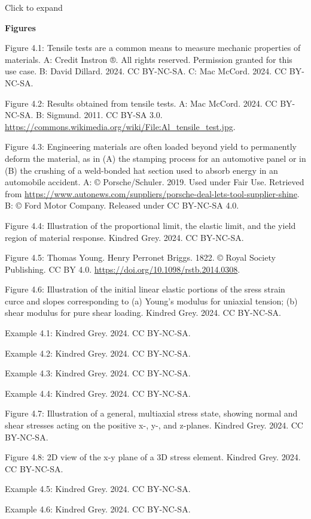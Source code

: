\documentclass[
  letterpaper,
  DIV=11,
  numbers=noendperiod]{scrreprt}
\theoremstyle{definition}
\theoremstyle{remark}
\begin{document}
Click to expand

\textbf{Figures}

Figure 4.1: Tensile tests are a common means to measure mechanic
properties of materials. A: Credit Instron ®. All rights reserved.
Permission granted for this use case. B: David Dillard. 2024. CC
BY-NC-SA. C: Mac McCord. 2024. CC BY-NC-SA.

Figure 4.2: Results obtained from tensile tests. A: Mac McCord. 2024. CC
BY-NC-SA. B: Sigmund. 2011. CC BY-SA 3.0.
\url{https://commons.wikimedia.org/wiki/File:Al_tensile_test.jpg}.

Figure 4.3: Engineering materials are often loaded beyond yield to
permanently deform the material, as in (A) the stamping process for an
automotive panel or in (B) the crushing of a weld-bonded hat section
used to absorb energy in an automobile accident. A: © Porsche/Schuler.
2019. Used under Fair Use. Retrieved from
\url{https://www.autonews.com/suppliers/porsche-deal-lets-tool-supplier-shine}.
B: © Ford Motor Company. Released under CC BY-NC-SA 4.0.

Figure 4.4: Illustration of the proportional limit, the elastic limit,
and the yield region of material response. Kindred Grey. 2024. CC
BY-NC-SA.

Figure 4.5: Thomas Young. Henry Perronet Briggs. 1822. © Royal Society
Publishing. CC BY 4.0. \url{https://doi.org/10.1098/rstb.2014.0308}.

Figure 4.6: Illustration of the initial linear elastic portions of the
sress strain curce and slopes corresponding to (a) Young's modulus for
uniaxial tension; (b) shear modulus for pure shear loading. Kindred
Grey. 2024. CC BY-NC-SA.

Example 4.1: Kindred Grey. 2024. CC BY-NC-SA.

Example 4.2: Kindred Grey. 2024. CC BY-NC-SA.

Example 4.3: Kindred Grey. 2024. CC BY-NC-SA.

Example 4.4: Kindred Grey. 2024. CC BY-NC-SA.

Figure 4.7: Illustration of a general, multiaxial stress state, showing
normal and shear stresses acting on the positive x-, y-, and z-planes.
Kindred Grey. 2024. CC BY-NC-SA.

Figure 4.8: 2D view of the x-y plane of a 3D stress element. Kindred
Grey. 2024. CC BY-NC-SA.

Example 4.5: Kindred Grey. 2024. CC BY-NC-SA.

Example 4.6: Kindred Grey. 2024. CC BY-NC-SA.
\end{document}
